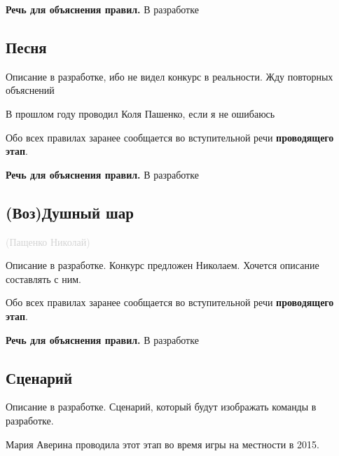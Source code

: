 \documentclass[a4paper, 14pt]{extarticle}
\theoremstyle{definition}
\begin{document}
\par \textbf{Речь для объяснения правил.} В разработке


{}
\subsection*{Песня}

\par Описание в разработке, ибо не видел конкурс в реальности. Жду повторных объяснений

\par В прошлом году проводил Коля Пашенко, если я не ошибаюсь

\par Обо всех правилах заранее сообщается во вступительной речи \textbf{проводящего этап}.

\par \textbf{Речь для объяснения правил.} В разработке



{}
\subsection*{(Воз)Душный шар}

\textcolor{lightgray}{(Пащенко Николай)}
\par Описание в разработке. Конкурс предложен Николаем. Хочется описание составлять с ним.

\par 

\par Обо всех правилах заранее сообщается во вступительной речи \textbf{проводящего этап}.

\par \textbf{Речь для объяснения правил.} В разработке


{}
\subsection*{Сценарий}

\par Описание в разработке. Сценарий, который будут изображать команды в разработке.

\par Мария Аверина проводила этот этап во время игры на местности в 2015.
\end{document}
